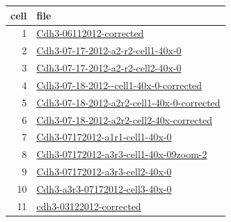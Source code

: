 \documentclass{article}
\begin{document}
\begin{table}
  \centering
  \begin{tabular}{rl}
    \toprule
    cell & file \\
    \midrule
    1& \url{Cdh3-06112012-corrected} \\
    2& \url{Cdh3-07-17-2012-a2-r2-cell1-40x-0} \\
    3& \url{Cdh3-07-17-2012-a2-r2-cell2-40x-0} \\
    4& \url{Cdh3-07-18-2012--cell1-40x-0-corrected} \\
    5& \url{Cdh3-07-18-2012-a2r2-cell1-40x-0-corrected} \\
    6& \url{Cdh3-07-18-2012-a2r2-cell2-40x-corrected} \\
    7& \url{Cdh3-07172012-a1r1-cell1-40x-0} \\
    8& \url{Cdh3-07172012-a3r3-cell1-40x-09zoom-2} \\
    9& \url{Cdh3-07172012-a3r3-cell2-40x-0} \\
    10& \url{Cdh3-a3r3-07172012-cell3-40x-0} \\
    11& \url{cdh3-03122012-corrected} \\
    \bottomrule
  \end{tabular}
\end{table}



\clearpage

\begin{figure}
  \centering
  \caption{}
\end{figure}
\end{document}
